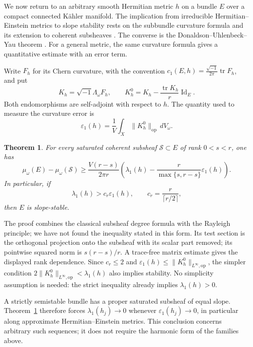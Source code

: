 \documentclass[11pt]{amsart}
\newtheorem{theorem}{Theorem}[section]
\theoremstyle{definition}
\theoremstyle{remark}
\newcommand{\tr}{\operatorname{tr}}
\newcommand{\id}{\operatorname{Id}}
\newcommand{\op}{\mathrm{op}}
\newcommand{\dvol}{\,dV_\omega}
\begin{document}
We now return to an arbitrary smooth Hermitian metric $h$ on a bundle
$E$ over a compact connected K\"ahler manifold. The implication from
irreducible Hermitian--Einstein metrics to slope stability rests on
the subbundle curvature formula and its extension to coherent
subsheaves \cite{Kobayashi1987,Lubke1983}. The converse is the
Donaldson--Uhlenbeck--Yau theorem
\cite{Donaldson1985,UhlenbeckYau1986}. For a general metric, the same
curvature formula gives a quantitative estimate with an error term.

Write $F_h$ for its Chern curvature, with the convention
$c_1(E,h)=\frac{\sqrt{-1}}{2\pi}\tr F_h$, and put
\begin{equation}\label{eq:curvature}
 K_h=\sqrt{-1}\Lambda_\omega F_h,
 \qquad K_h^0=K_h-\frac{\tr K_h}{r}\id_E.
\end{equation}
Both endomorphisms are self-adjoint with respect to $h$. The quantity used
to measure the curvature error is
\begin{equation}\label{eq:epsilon}
 \varepsilon_1(h)=\frac1V\int_X\lVert K_h^0\rVert_{\op}\dvol.
\end{equation}
\begin{theorem}\label{thm:main}
For every saturated coherent subsheaf $\mathcal S\subset E$ of rank
$0<s<r$, one has
\begin{equation}\label{eq:main}
 \mu_\omega(E)-\mu_\omega(\mathcal S)
 \ge \frac{V(r-s)}{2\pi r}
 \left(\lambda_1(h)-\frac{r}{\max\{s,r-s\}}\varepsilon_1(h)\right).
\end{equation}
In particular, if
\begin{equation}\label{eq:criterion}
 \lambda_1(h)>c_r\varepsilon_1(h),
 \qquad c_r=\frac{r}{\lceil r/2\rceil},
\end{equation}
then $E$ is slope-stable.
\end{theorem}

The proof combines the classical subsheaf degree formula with the
Rayleigh principle; we have not found the inequality stated in this form. Its test section is the orthogonal projection onto
the subsheaf with its scalar part removed; its pointwise squared norm
is $s(r-s)/r$. A trace-free matrix estimate gives the displayed rank
dependence. Since $c_r\le2$ and
$\varepsilon_1(h)\le\lVert K_h^0\rVert_{L^\infty,\op}$, the simpler
condition $2\lVert K_h^0\rVert_{L^\infty,\op}<\lambda_1(h)$ also
implies stability. No simplicity assumption is needed: the strict
inequality already implies $\lambda_1(h)>0$.

A strictly semistable bundle has a proper saturated subsheaf of equal
slope. Theorem~\ref{thm:main} therefore forces $\lambda_1(h_j)\to0$
whenever $\varepsilon_1(h_j)\to0$, in particular along approximate
Hermitian--Einstein metrics. This conclusion concerns arbitrary such
sequences; it does not require the harmonic form of the families above.
\end{document}
